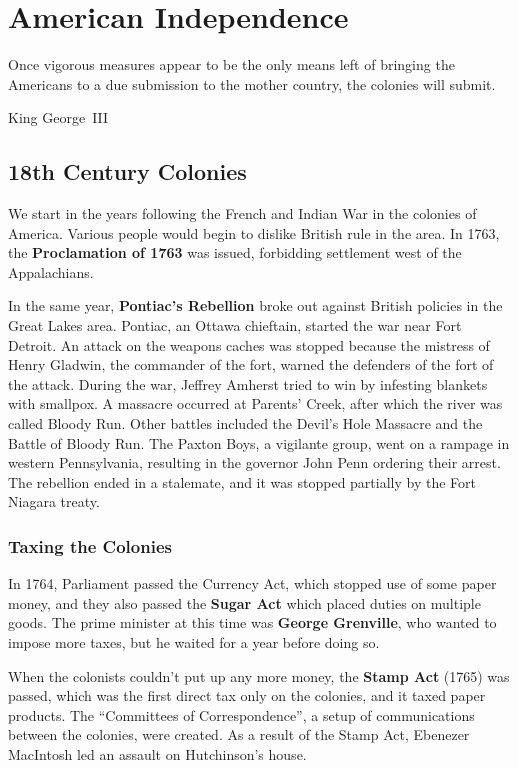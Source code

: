 \chapter{American Independence}

\epigraph{%
  Once vigorous measures appear to be the only means left
  of bringing the Americans to a due submission to the mother country,
  the colonies will submit.
}{King George~III}

\section{18th Century Colonies}

We start in the years following the French and Indian War in the colonies of America.
Various people would begin to dislike British rule in the area.
In 1763, the \textbf{Proclamation of 1763} was issued, forbidding settlement west of the Appalachians.

In the same year, \textbf{Pontiac's Rebellion} broke out against British policies in the Great Lakes area.
Pontiac, an Ottawa chieftain, started the war near Fort Detroit.
An attack on the weapons caches was stopped because the mistress of Henry Gladwin, the commander of the fort,
warned the defenders of the fort of the attack.
During the war, Jeffrey Amherst tried to win by infesting blankets with smallpox.
A massacre occurred at Parents' Creek, after which the river was called Bloody Run.
Other battles included the Devil's Hole Massacre and the Battle of Bloody Run.
The Paxton Boys, a vigilante group, went on a rampage in western Pennsylvania,
resulting in the governor John Penn ordering their arrest.
The rebellion ended in a stalemate, and it was stopped partially by the Fort Niagara treaty.

\subsection*{Taxing the Colonies}

In 1764, Parliament passed the Currency Act, which stopped use of some paper money,
and they also passed the \textbf{Sugar Act} which placed duties on multiple goods.
The prime minister at this time was \textbf{George Grenville}, who wanted to impose more taxes,
but he waited for a year before doing so.

When the colonists couldn't put up any more money, the \textbf{Stamp Act} (1765) was passed,
which was the first direct tax only on the colonies, and it taxed paper products.
The ``Committees of Correspondence'', a setup of communications between the colonies, were created.
As a result of the Stamp Act, Ebenezer MacIntosh led an assault on Hutchinson's house.

